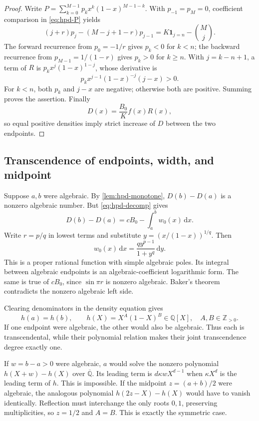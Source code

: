 \documentclass[11pt,a4paper]{article}
\numberwithin{equation}{section}
\newtheorem{lemma}[theorem]{Lemma}
\theoremstyle{definition}
\theoremstyle{remark}
\newcommand{\Q}{\mathbb Q}
\newcommand{\Qb}{\overline{\mathbb Q}}
\newcommand{\Z}{\mathbb Z}
\newcommand{\dd}{\,\mathrm d}
\begin{document}
\begin{proof}
Write $P=\sum_{k=0}^{M-1}p_kx^k(1-x)^{M-1-k}$. With
$p_{-1}=p_M=0$, coefficient comparison in \eqref{eq:hpd-P} yields
\[
 (j+r)p_j-(M-j+1-r)p_{j-1}
 =K\mathbf1_{j=n}-\binom Mj.
\]
The forward recurrence from $p_0=-1/r$ gives $p_k<0$ for $k<n$; the
backward recurrence from $p_{M-1}=1/(1-r)$ gives $p_k>0$ for $k\ge n$.
With $j=k-n+1$, a term of $R$ is $p_kx^j(1-x)^{1-j}$, whose derivative is
\[
 p_kx^{j-1}(1-x)^{-j}(j-x)>0.
\]
For $k<n$, both $p_k$ and $j-x$ are negative; otherwise both are positive.
Summing proves the assertion. Finally
\[
 D(x)=\frac{B_0}{K}f(x)R(x),
\]
so equal positive densities imply strict increase of $D$ between the two
endpoints.
\end{proof}

\subsection{Transcendence of endpoints, width, and midpoint}
Suppose $a,b$ were algebraic. By \cref{lem:hpd-monotone}, $D(b)-D(a)$ is a
nonzero algebraic number. But \eqref{eq:hpd-decomp} gives
\[
 D(b)-D(a)=cB_0-\int_a^bw_0(x)\dd x.
\]
Write $r=p/q$ in lowest terms and substitute
$y=(x/(1-x))^{1/q}$. Then
\[
 w_0(x)\dd x=\frac{qy^{p-1}}{1+y^q}\dd y.
\]
This is a proper rational function with simple algebraic poles. Its integral
between algebraic endpoints is an algebraic-coefficient logarithmic form.
The same is true of $cB_0$, since $\sin\pi r$ is nonzero algebraic.
Baker's theorem contradicts the nonzero algebraic left side.

Clearing denominators in the density equation gives
\begin{equation}\label{eq:hpd-curve}
 h(a)=h(b),\qquad h(X)=X^A(1-X)^B\in\Q[X],\quad A,B\in\Z_{>0}.
\end{equation}
If one endpoint were algebraic, the other would also be algebraic. Thus each
is transcendental, while their polynomial relation makes their joint
transcendence degree exactly one.

If $w=b-a>0$ were algebraic, $a$ would solve the nonzero polynomial
$h(X+w)-h(X)$ over $\Qb$. Its leading term is $d\kappa wX^{d-1}$ when
$\kappa X^d$ is the leading term of $h$. This is impossible. If the midpoint
$z=(a+b)/2$ were algebraic, the analogous polynomial
$h(2z-X)-h(X)$ would have to vanish identically. Reflection must interchange
the only roots $0,1$, preserving multiplicities, so $z=1/2$ and $A=B$.
This is exactly the symmetric case.
\end{document}
